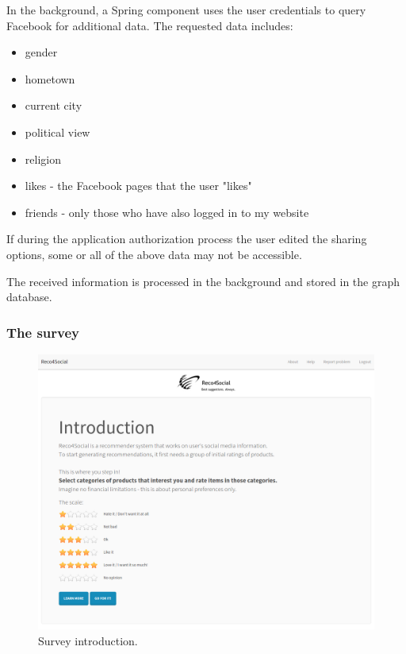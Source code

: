 \documentclass[12pt]{report}
\begin{document}
In the background, a Spring component uses the user credentials to query Facebook for additional data. The requested data includes:
\begin{itemize}
\item gender
\item hometown
\item current city
\item political view
\item religion
\item likes - the Facebook pages that the user "likes"
\item friends - only those who have also logged in to my website
\end{itemize}

If during the application authorization process the user edited the sharing options, some or all of the above data may not be accessible.

The received information is processed in the background and stored in the graph database.

\subsubsection{The survey}
\begin{figure}[!t]
\centering
\includegraphics[width=\textwidth]{reco4_survey-intro-1.png} 
\caption[Survey introduction.]{Survey introduction.}
\label{fig.survey.intro-1}
\end{figure}
\end{document}
